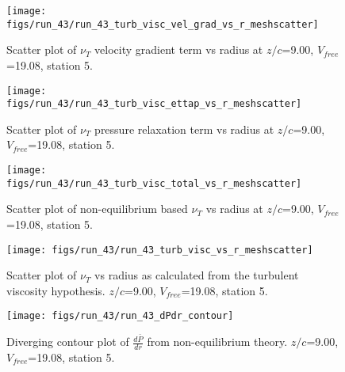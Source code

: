 \begin{figure}[H]
\centering
\texttt{[image: figs/run\_43/run\_43\_turb\_visc\_vel\_grad\_vs\_r\_meshscatter]}
\caption{Scatter plot of $\nu_T$ velocity gradient term vs radius at $z/c$=9.00, $V_{free}$=19.08, station 5.}
\end{figure}


\begin{figure}[H]
\centering
\texttt{[image: figs/run\_43/run\_43\_turb\_visc\_ettap\_vs\_r\_meshscatter]}
\caption{Scatter plot of $\nu_T$ pressure relaxation term vs radius at $z/c$=9.00, $V_{free}$=19.08, station 5.}
\end{figure}


\begin{figure}[H]
\centering
\texttt{[image: figs/run\_43/run\_43\_turb\_visc\_total\_vs\_r\_meshscatter]}
\caption{Scatter plot of non-equilibrium based $\nu_T$ vs radius at $z/c$=9.00, $V_{free}$=19.08, station 5.}
\end{figure}


\begin{figure}[H]
\centering
\texttt{[image: figs/run\_43/run\_43\_turb\_visc\_vs\_r\_meshscatter]}
\caption{Scatter plot of $\nu_T$ vs radius as calculated from the turbulent viscosity hypothesis. $z/c$=9.00, $V_{free}$=19.08, station 5.}
\end{figure}


\begin{figure}[H]
\centering
\texttt{[image: figs/run\_43/run\_43\_dPdr\_contour]}
\caption{Diverging contour plot of $\frac{d\bar{P}}{dr}$ from non-equilibrium theory. $z/c$=9.00, $V_{free}$=19.08, station 5.}
\end{figure}


